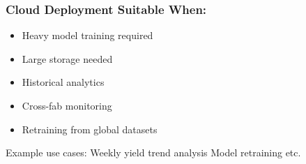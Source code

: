 \subsubsection{Cloud Deployment Suitable When:}
\begin{itemize}
\item  Heavy model training required
\item  Large storage needed
\item  Historical analytics
\item  Cross-fab monitoring
\item  Retraining from global datasets
\end{itemize}
Example use cases:\newline
Weekly yield trend analysis\newline
Model retraining etc.\newline

